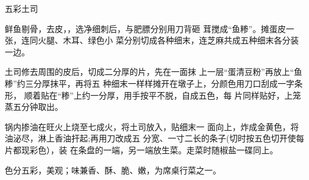 \begin{recipe}{五彩土司}

\ingredients



\cooking

\step 	鲜鱼剔骨，去皮，，选净细刺后，与肥膘分别用刀背砸 茸搅成“鱼糁”。摊蛋皮一张，连同火腿、木耳、绿色小 菜分别切成各种细末，连芝麻共成五种细末各分装一边。

\step 	土司修去周围的皮后，切成二分厚的片，先在一面抹 上一层“蛋清豆粉”再放上“鱼糁”约三分厚抹平，再将五 种细末一样样摊开在墩子上，分颜色用刀口刮成一字条形， 顺着贴在“糁”上约一分厚，用手按平不脱，自成五色，每 片同样贴好，上笼蒸五分钟取出。

\step 	锅内掺油在旺火上烧至七成火，将土司放入，贴细末一 面向上，炸成金黄色，将油泌尽，淋上香油扞起;再用刀改成五 分宽、一寸二长的条子(切时按五色切开使每片都现彩色），装 在条盘的一端，另一端放生菜。走菜时随椒盐一碟同上。

\notes

色分五彩，美观；味兼香、酥、脆、嫩，为席桌行菜之一。

\end{recipe}

